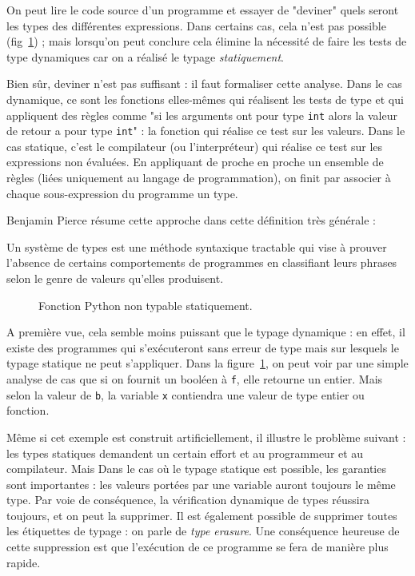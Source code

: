 On peut lire le code source d'un programme et essayer de "deviner" quels seront
les types des différentes expressions. Dans certains cas, cela n'est pas
possible (fig~\ref{fig:nontypable}) ; mais lorsqu'on peut conclure cela élimine
la nécessité de faire les tests de type dynamiques car on a réalisé le typage
\emph{statiquement}.

Bien sûr, deviner n'est pas suffisant : il faut formaliser cette analyse. Dans
le cas dynamique, ce sont les fonctions elles-mêmes qui réalisent les tests de
type et qui appliquent des règles comme "si les arguments ont pour type
\texttt{int} alors la valeur de retour a pour type \texttt{int}" : la fonction
qui réalise ce test sur les valeurs. Dans le cas statique, c'est le compilateur
(ou l'interpréteur) qui réalise ce test sur les expressions non évaluées. En
appliquant de proche en proche un ensemble de règles (liées uniquement au
langage de programmation), on finit par associer à chaque sous-expression du
programme un type.

Benjamin Pierce résume cette approche dans cette définition très générale :

\begin{definition}
Un système de types est une méthode syntaxique tractable qui vise à prouver
l'absence de certains comportements de programmes en classifiant leurs phrases
selon le genre de valeurs qu'elles produisent. \cite{TAPL}
\end{definition}

\begin{figure}
  \caption{Fonction Python non typable statiquement.}
  \label{fig:nontypable}
\end{figure}

A première vue, cela semble moins puissant que le typage dynamique : en effet,
il existe des programmes qui s'exécuteront sans erreur de type mais sur lesquels
le typage statique ne peut s'appliquer. Dans la figure~\ref{fig:nontypable}, on
peut voir par une simple analyse de cas que si on fournit un booléen à
\texttt{f}, elle retourne un entier. Mais selon la valeur de \texttt{b}, la
variable \texttt{x} contiendra une valeur de type entier ou fonction.

Même si cet exemple est construit artificiellement, il illustre le problème
suivant : les types statiques demandent un certain effort et au programmeur et
au compilateur. Mais Dans le cas où le typage statique est possible, les
garanties sont importantes : les valeurs portées par une variable auront
toujours le même type. Par voie de conséquence, la vérification dynamique de
types réussira toujours, et on peut la supprimer. Il est également possible
de supprimer toutes les étiquettes de typage : on parle de \emph{type erasure}.
Une conséquence heureuse de cette suppression est que l'exécution de ce
programme se fera de manière plus rapide.

